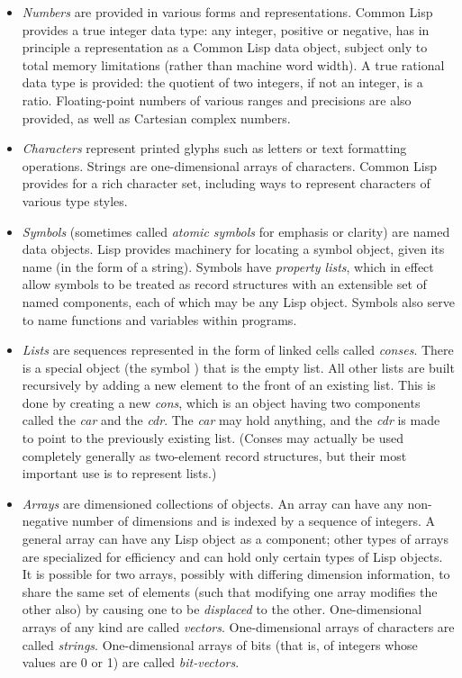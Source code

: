 \begin{itemize}
\item
\emph{Numbers} are provided in various forms and representations.
Common Lisp provides a true integer data type: any integer,
positive or negative, has in principle a representation as a
Common Lisp data object, subject only to total memory limitations (rather than
machine word width).
A true rational data type is provided: the quotient of two integers,
if not an integer, is a ratio.
Floating-point numbers of various ranges and precisions are also
provided, as well as
Cartesian complex numbers.

\item
\emph{Characters} represent printed glyphs such as letters
or text formatting operations.  Strings are one-dimensional
arrays of characters.
Common Lisp provides for a rich character set, including ways to
represent characters of various type styles.

\item
\emph{Symbols} (sometimes called \emph{atomic symbols} for emphasis
or clarity) are named data objects.  Lisp provides machinery
for locating a symbol object, given its name (in the form
of a string).  Symbols have \emph{property lists}, which in effect
allow symbols to be treated as record structures with an extensible
set of named components, each of which may be any Lisp object.
Symbols also serve to name functions and variables within programs.

\item
\emph{Lists} are sequences represented in the form of linked cells
called \emph{conses}.  There is a special object (the symbol {\nil})
that is the empty list.  All other lists are built recursively by adding a new
element to the front of an existing list.  This is done by
creating a new \emph{cons}, which is an object having two components
called the \emph{car} and the \emph{cdr}.  The \emph{car} may hold anything,
and the \emph{cdr} is made to point to the previously existing list.
(Conses may actually be used completely generally as two-element
record structures, but their most important use is to represent
lists.)

\item
\emph{Arrays} are dimensioned collections of objects.
An array can have any non-negative number of dimensions and is indexed
by a sequence of integers.  A general array can have any Lisp object as
a component; other types of arrays are specialized for efficiency
and can hold only certain types of Lisp objects.
It is possible for two arrays, possibly with differing dimension information,
to share the same set of elements (such that modifying one array modifies
the other also) by causing one to be \emph{displaced} to the other.
One-dimensional arrays of any kind are called \emph{vectors}.
One-dimensional arrays of characters are called \emph{strings}.
One-dimensional arrays of bits (that is, of integers whose values are 0 or 1)
are called \emph{bit-vectors}.


\end{itemize}
